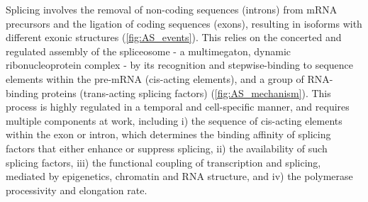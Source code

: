 Splicing involves the removal of non-coding sequences (introns) from mRNA precursors and the ligation of coding sequences (exons), resulting in isoforms with different exonic structures (\cref{fig:AS_events}). This relies on the concerted and regulated assembly of the spliceosome - a multimegaton, dynamic ribonucleoprotein complex - by its recognition and stepwise-binding to sequence elements within the pre-mRNA (cis-acting elements), and a group of RNA-binding proteins (trans-acting splicing factors) (\cref{fig:AS_mechanism}). This process is highly regulated in a temporal and cell-specific manner, and requires multiple components at work, including i) the sequence of cis-acting elements within the exon or intron, which determines the binding affinity of splicing factors that either enhance or suppress splicing, ii) the availability of such splicing factors, iii) the functional coupling of transcription and splicing, mediated by epigenetics, chromatin and RNA structure, and iv) the polymerase processivity and elongation rate.


